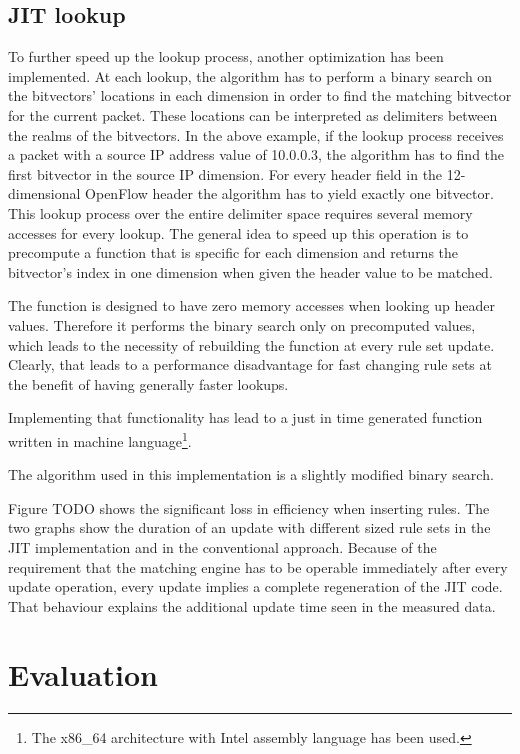 \documentclass[a4paper,
		12pt,
		parskip=full,
		titlepage
		]{scrartcl}
\begin{document}
\subsection{JIT lookup}
To further speed up the lookup process, another optimization has been implemented.
At each lookup, the algorithm has to perform a binary search on the bitvectors' locations in each dimension in order to find the matching bitvector for the current packet.
These locations can be interpreted as delimiters between the realms of the bitvectors.
In the above example, if the lookup process receives a packet with a source IP address value of 10.0.0.3, the algorithm has to find the first bitvector in the source IP dimension. %
For every header field in the 12-dimensional OpenFlow header the algorithm has to yield exactly one bitvector.
This lookup process over the entire delimiter space requires several memory accesses for every lookup.
The general idea to speed up this operation is to precompute a function that is specific for each dimension and returns the bitvector's index in one dimension when given the header value to be matched.

The function is designed to have zero memory accesses when looking up header values.
Therefore it performs the binary search only on precomputed values, which leads to the necessity of rebuilding the function at every rule set update.
Clearly, that leads to a performance disadvantage for fast changing rule sets at the benefit of having generally faster lookups.

Implementing that functionality has lead to a just in time generated function written in machine language\footnote{The x86\_64 architecture with Intel assembly language has been used.}.

The algorithm used in this implementation is a slightly modified binary search.

Figure TODO shows the significant loss in efficiency when inserting rules. %
The two graphs show the duration of an update with different sized rule sets in the JIT implementation and in the conventional approach.
Because of the requirement that the matching engine has to be operable immediately after every update operation, every update implies a complete regeneration of the JIT code.
That behaviour explains the additional update time seen in the measured data. 

\section{Evaluation}
\end{document}
